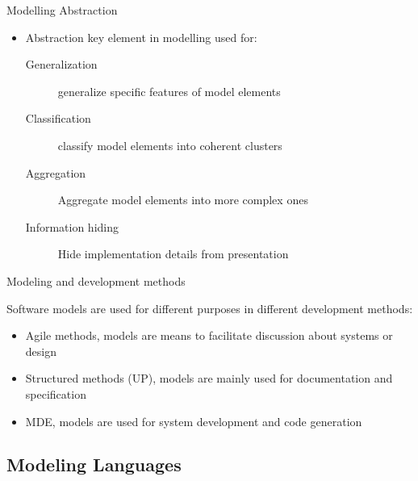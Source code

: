 \documentclass[slidetop,mathserif,red]{beamer}
\begin{document}
\begin{frame}{Modelling Abstraction}

    \begin{itemize}
    \item Abstraction key element in modelling used for:

        \begin{description}
        \item[Generalization] generalize specific features of model elements

        \item[Classification] classify model elements into coherent clusters
        
        \item[Aggregation] Aggregate model elements into more complex ones 
        
        \item[Information hiding] Hide implementation details from presentation 
        \end{description}
    \end{itemize}

\end{frame}






\begin{frame}{Modeling and development methods}

    Software models are used for different purposes in different development methods:
        \begin{itemize}
        \item Agile methods, models are means to facilitate discussion about systems or design
        \item Structured methods (UP), models are mainly used for documentation and specification
        \item MDE, models are used for system development and code generation
        \end{itemize}
\end{frame}





\subsection{Modeling Languages}
\end{document}
